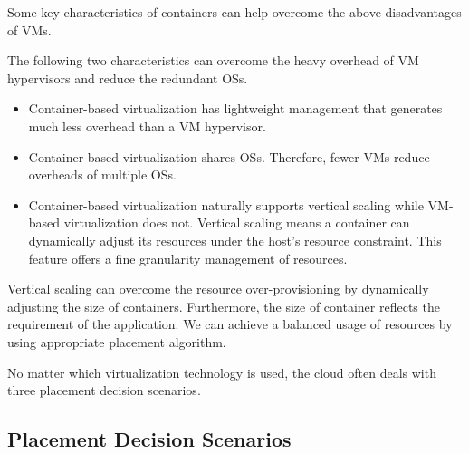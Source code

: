 Some key characteristics of containers can help overcome the above disadvantages of VMs.

The following two characteristics can overcome the heavy overhead of VM hypervisors and reduce the redundant OSs.
\begin{itemize}
	\item Container-based virtualization has lightweight management that generates much less overhead than a VM hypervisor. 
	\item Container-based virtualization shares OSs. Therefore, fewer VMs reduce overheads of multiple OSs.

	\item Container-based virtualization naturally supports vertical scaling while VM-based virtualization does not. Vertical scaling means a container can dynamically adjust its resources under the host's resource constraint. This feature offers a fine granularity management of resources. 

\end{itemize}

	Vertical scaling can overcome the resource over-provisioning by dynamically adjusting the size of containers. Furthermore, the size of container reflects the requirement of the application. We can achieve a balanced usage of resources by using appropriate placement algorithm.


 No matter which virtualization technology is used, the cloud often deals with three placement decision scenarios. 




\subsection{Placement Decision Scenarios}
\label{sec:scenarios}


